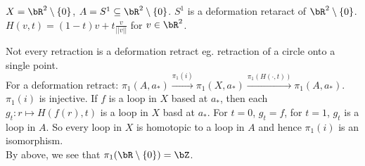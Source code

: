 \begin{example}
    $X = \bR^2 \setminus \{0\}$, $A = S^1 \subseteq \bR^2 \setminus \{0\}$. $S^1$ is a deformation retaract of $\bR^2 \setminus \{0\}$. $H(v,t) = (1-t)v + t \frac{v}{||v||}$ for $v \in \bR^2$. 
\end{example}

\noindent
Not every retraction is a deformation retract eg. retraction of a circle onto a single point. \\

\noindent
For a deformation retract: $\pi_1(A, a_*) \stackrel{\pi_1(i)}{\to} \pi_1(X, a_*) \stackrel{\pi_1(H( \cdot, t))}{\to} \pi_1(A, a_*)$. $\pi_1(i)$ is injective. If $f$ is a loop in $X$ based at $a_*$, then each $g_t: r \mapsto H(f(r),t)$ is a loop in $X$ basd at $a_*$. For $t=0$, $g_t = f$, for $t=1$, $g_t$ is a loop in $A$. So every loop in $X$ is homotopic to a loop in $A$ and hence $\pi_1(i)$ is an isomorphism. \\
By above, we see that $\pi_1(\bR \setminus\{0\}) = \bZ$. 
